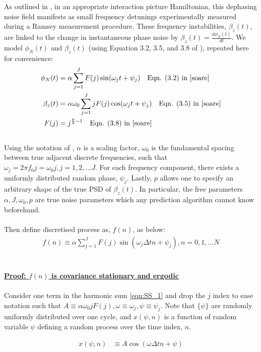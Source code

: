 As outlined in \cite{soare}, in an appropriate interaction picture Hamiltonian, this dephasing noise field manifests as small frequency detunings experimentally measured during a Ramsey measurement procedure. These frequency instabilities, $\beta_z(t)$,  are linked to the change in instantaneous phase noise by $\beta_z(t) = \frac{d \phi_N(t)}{dt}$. We model $\phi_N(t)$ and $\beta_z(t)$ (using Equation 3.2, 3.5, and 3.8 of \cite{soare}), repeated here for convenience:
\begin{align}
\phi_N(t) &= \alpha \sum_{j=1}^{J} F(j)\sin(\omega_j t + \psi_j) \quad \text{Eqn. (3.2) in \cite{soare}} \\
\beta_z(t) &= \alpha \omega_0 \sum_{j=1}^{J} j F(j)\cos(\omega_j t + \psi_j) \quad \text{Eqn. (3.5) in \cite{soare}} \\
F(j) & = j^{\frac{p}{2}-1} \quad \text{Eqn. (3.8) in \cite{soare}}  
\end{align}
\\
Using the notation of \cite{soare}, $\alpha$ is a scaling factor, $\omega_0$ is the fundamental spacing between true adjacent discrete frequencies, such that $\omega_j = 2 \pi f_0 j =\omega_0 j, j = 1, 2, ...J$. For each frequency component, there exists a uniformly distributed random phase, $\psi_j$. Lastly, $p$ allows one to specify an arbitrary shape of the true PSD of $\beta_z(t)$. In particular, the free parameters $\alpha, J, \omega_0, p$ are true noise parameters which any prediction algorithm cannot know beforehand. 
\\
\\
Then define discretised process as, $f(n)$, as below:
\begin{align}
f(n) \equiv \alpha \sum_{j=1}^{J} F(j)\sin(\omega_j \Delta t n + \psi_j), n = 0, 1, ...N  \label{eqn:SS_1}
\end{align}
\\
\\
\underline{\textbf{Proof: $f(n)$ is covariance stationary and ergodic}}
\\
\\
Consider one term in the harmonic sum \ref{eqn:SS_1} and drop the $j$ index to ease notation such that $A \equiv \alpha \omega_0 j F(j), \omega \equiv \omega_j, \psi \equiv \psi_j$. Note that $\{ \psi \}$ are randomly uniformly distributed over one cycle, and $x(\psi, n)$ is a function of random variable $\psi$ defining a random process over the time index, $n$. 

\begin{align}
x(\psi, n) & \equiv A \cos(\omega \Delta t n + \psi ) 
\end{align}

